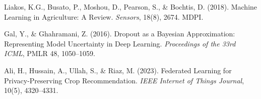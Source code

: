 \documentclass[12pt,a4paper,oneside]{report}
\begin{document}
\begin{enumerate}[leftmargin=*, label={[\arabic*]}]
\item Liakos, K.G., Busato, P., Moshou, D., Pearson, S., \& Bochtis, D. (2018). Machine Learning in Agriculture: A Review. \textit{Sensors}, 18(8), 2674. MDPI.

\item Gal, Y., \& Ghahramani, Z. (2016). Dropout as a Bayesian Approximation: Representing Model Uncertainty in Deep Learning. \textit{Proceedings of the 33rd ICML}, PMLR 48, 1050--1059.

\item Ali, H., Hussain, A., Ullah, S., \& Riaz, M. (2023). Federated Learning for Privacy-Preserving Crop Recommendation. \textit{IEEE Internet of Things Journal}, 10(5), 4320--4331.

\end{enumerate}
\end{document}

